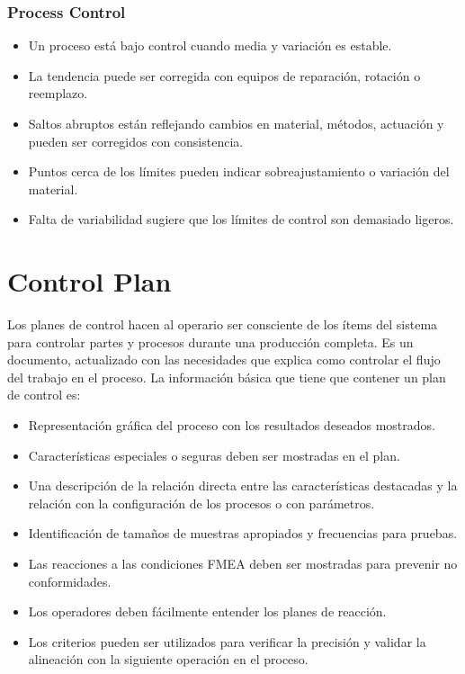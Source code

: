 \documentclass[]{article}
\begin{document}
\subsubsection{Process Control}
\begin{itemize}
	\item Un proceso está bajo control cuando media y variación es estable.
	\item La tendencia puede ser corregida con equipos de reparación, rotación o reemplazo.
	\item Saltos abruptos están reflejando cambios en material, métodos, actuación y pueden ser corregidos con consistencia.
	\item Puntos cerca de los límites pueden indicar sobreajustamiento o variación del material.
	\item Falta de variabilidad sugiere que los límites de control son demasiado ligeros.
\end{itemize}

\section{Control Plan}

Los planes de control hacen al operario ser consciente de los ítems del sistema para controlar partes y procesos durante una producción completa. Es un documento, actualizado con las necesidades que explica como controlar el flujo del trabajo en el proceso. La información básica que tiene que contener un plan de control es:
\begin{itemize}
	\item Representación gráfica del proceso con los resultados deseados mostrados.
	\item Características especiales o seguras deben ser mostradas en el plan.
	\item Una descripción de la relación directa entre las características destacadas y la relación con la configuración de los procesos o con parámetros.
	\item Identificación de tamaños de muestras apropiados y frecuencias para pruebas.
	\item Las reacciones a las condiciones FMEA deben ser mostradas para prevenir no conformidades.
	\item Los operadores deben fácilmente entender los planes de reacción.
	\item Los criterios pueden ser utilizados para verificar la precisión y validar la alineación con la siguiente operación en el proceso.
\end{itemize}
\end{document}

